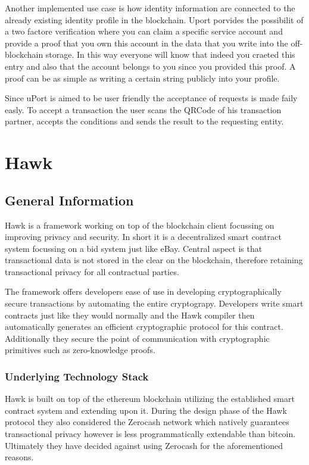 Another implemented use case is how identity information are connected to the already existing identity profile in the blockchain. Uport porvides the possibilit of a two factore verification where you can claim a specific service account and provide a proof that you own this account in the data that you write into the off-blockchain storage. In this way everyone will know that indeed you craeted this entry and also that the account belongs to you since you provided this proof. A proof can be as simple as writing a certain string publicly into your profile. 

Since uPort is aimed to be user friendly the acceptance of requests is made faily easly. To accept a transaction the user scans the QRCode of his transaction partner, accepts the conditions and sends the result to the requesting entity.



\section{Hawk}
\subsection{General Information}
Hawk is a framework working on top of the blockchain client focussing on improving privacy and security. In short it is a decentralized smart contract system focussing on a bid system just like eBay. Central aspect is that transactional data is not stored in the clear on the blockchain, therefore retaining transactional privacy for all contractual parties.

The framework offers developers ease of use in developing cryptographically secure transactions by automating the entire cryptograpy. Developers write smart contracts just like they would normally and the Hawk compiler then automatically generates an efficient cryptographic protocol for this contract. Additionally they secure the point of communication with cryptographic primitives such as zero-knowledge proofs.

\subsubsection{Underlying Technology Stack}
Hawk is built on top of the ethereum blockchain utilizing the established smart contract system and extending upon it. During the design phase of the Hawk protocol they also considered the Zerocash network which natively guarantees transactional privacy however is less programmatically extendable than bitcoin. Ultimately they have decided against using Zerocash for the aforementioned reasons.

